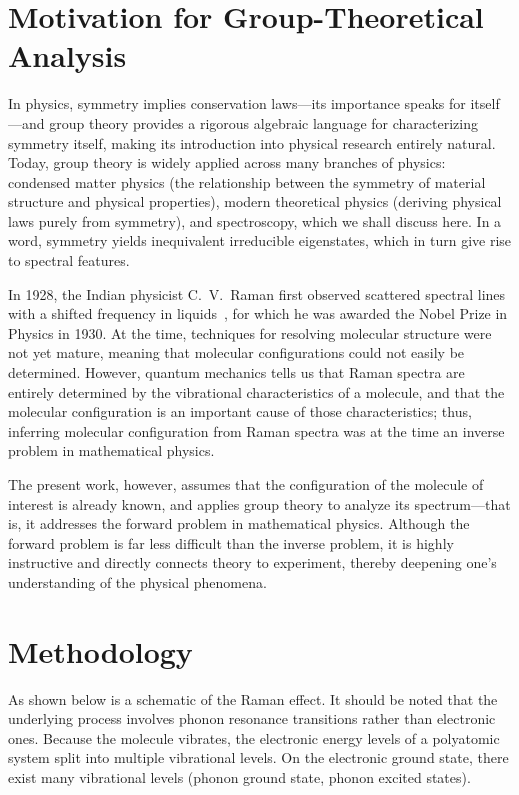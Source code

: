 \documentclass[lang=en, column=onecolumn, mathfont=times]{spArticle}
\begin{document}
\section{Motivation for Group-Theoretical Analysis}

In physics, symmetry implies conservation laws---its importance speaks for itself---and group theory provides a rigorous algebraic language for characterizing symmetry itself, making its introduction into physical research entirely natural. Today, group theory is widely applied across many branches of physics: condensed matter physics (the relationship between the symmetry of material structure and physical properties), modern theoretical physics (deriving physical laws purely from symmetry), and spectroscopy, which we shall discuss here. In a word, symmetry yields inequivalent irreducible eigenstates, which in turn give rise to spectral features.

In 1928, the Indian physicist C.~V.~Raman first observed scattered spectral lines with a shifted frequency in liquids~\cite{RamanKrishnan1928Nature}, for which he was awarded the Nobel Prize in Physics in 1930. At the time, techniques for resolving molecular structure were not yet mature, meaning that molecular configurations could not easily be determined. However, quantum mechanics tells us that Raman spectra are entirely determined by the vibrational characteristics of a molecule, and that the molecular configuration is an important cause of those characteristics; thus, inferring molecular configuration from Raman spectra was at the time an inverse problem in mathematical physics.

The present work, however, assumes that the configuration of the molecule of interest is already known, and applies group theory to analyze its spectrum---that is, it addresses the forward problem in mathematical physics. Although the forward problem is far less difficult than the inverse problem, it is highly instructive and directly connects theory to experiment, thereby deepening one's understanding of the physical phenomena.


\section{Methodology}

As shown below is a schematic of the Raman effect. It should be noted that the underlying process involves phonon resonance transitions rather than electronic ones. Because the molecule vibrates, the electronic energy levels of a polyatomic system split into multiple vibrational levels. On the electronic ground state, there exist many vibrational levels (phonon ground state, phonon excited states).
\end{document}

